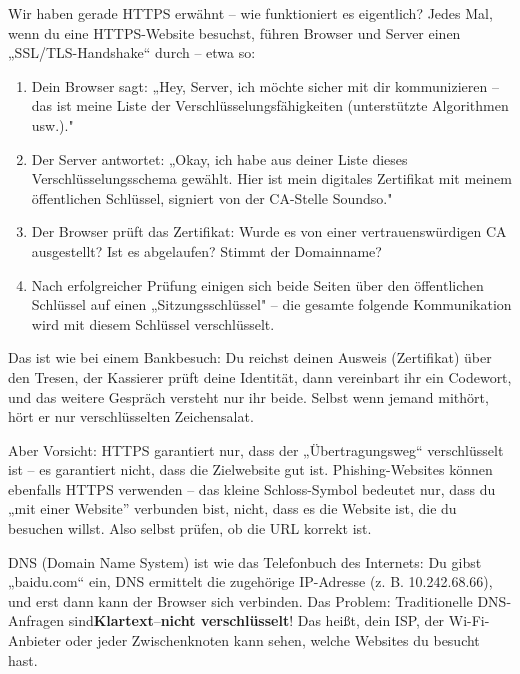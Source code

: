 
Wir haben gerade HTTPS erwähnt – wie funktioniert es eigentlich? Jedes Mal, wenn du eine HTTPS-Website besuchst, führen Browser und Server einen „SSL/TLS-Handshake“ durch – etwa so:

\begin{enumerate}
  \item Dein Browser sagt: „Hey, Server, ich möchte sicher mit dir kommunizieren – das ist meine Liste der Verschlüsselungsfähigkeiten (unterstützte Algorithmen usw.)."
  \item Der Server antwortet: „Okay, ich habe aus deiner Liste dieses Verschlüsselungsschema gewählt. Hier ist mein digitales Zertifikat mit meinem öffentlichen Schlüssel, signiert von der CA-Stelle Soundso."
  \item Der Browser prüft das Zertifikat: Wurde es von einer vertrauenswürdigen CA ausgestellt? Ist es abgelaufen? Stimmt der Domainname?
  \item Nach erfolgreicher Prüfung einigen sich beide Seiten über den öffentlichen Schlüssel auf einen „Sitzungsschlüssel" – die gesamte folgende Kommunikation wird mit diesem Schlüssel verschlüsselt.
\end{enumerate}

Das ist wie bei einem Bankbesuch: Du reichst deinen Ausweis (Zertifikat) über den Tresen, der Kassierer prüft deine Identität, dann vereinbart ihr ein Codewort, und das weitere Gespräch versteht nur ihr beide. Selbst wenn jemand mithört, hört er nur verschlüsselten Zeichensalat.

Aber Vorsicht: HTTPS garantiert nur, dass der „Übertragungsweg“ verschlüsselt ist – es garantiert nicht, dass die Zielwebsite gut ist. Phishing-Websites können ebenfalls HTTPS verwenden – das kleine Schloss-Symbol bedeutet nur, dass du „mit einer Website” verbunden bist, nicht, dass es die Website ist, die du besuchen willst. Also selbst prüfen, ob die URL korrekt ist.


DNS (Domain Name System) ist wie das Telefonbuch des Internets: Du gibst „baidu.com“ ein, DNS ermittelt die zugehörige IP-Adresse (z. B. 10.242.68.66), und erst dann kann der Browser sich verbinden. Das Problem: Traditionelle DNS-Anfragen sind\textbf{Klartext}–\textbf{nicht verschlüsselt}! Das heißt, dein ISP, der Wi-Fi-Anbieter oder jeder Zwischenknoten kann sehen, welche Websites du besucht hast.

